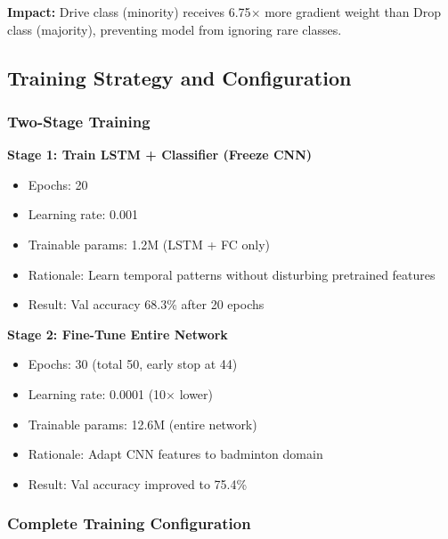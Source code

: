 \documentclass[11pt,a4paper]{article}
\begin{document}
\textbf{Impact:} Drive class (minority) receives 6.75$\times$ more gradient weight than Drop class (majority), preventing model from ignoring rare classes.

\subsection{Training Strategy and Configuration}

\subsubsection{Two-Stage Training}

\textbf{Stage 1: Train LSTM + Classifier (Freeze CNN)}
\begin{itemize}
\item Epochs: 20
\item Learning rate: 0.001
\item Trainable params: 1.2M (LSTM + FC only)
\item Rationale: Learn temporal patterns without disturbing pretrained features
\item Result: Val accuracy 68.3\% after 20 epochs
\end{itemize}

\textbf{Stage 2: Fine-Tune Entire Network}
\begin{itemize}
\item Epochs: 30 (total 50, early stop at 44)
\item Learning rate: 0.0001 (10$\times$ lower)
\item Trainable params: 12.6M (entire network)
\item Rationale: Adapt CNN features to badminton domain
\item Result: Val accuracy improved to 75.4\%
\end{itemize}

\subsubsection{Complete Training Configuration}
\end{document}
